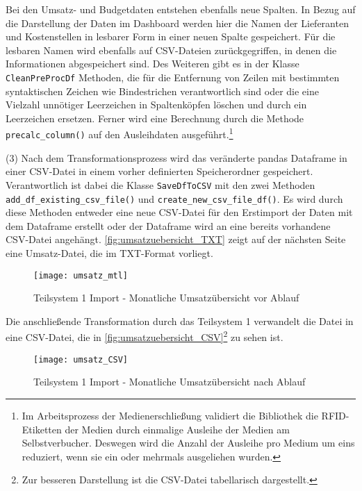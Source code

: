     
    Bei den Umsatz- und Budgetdaten entstehen ebenfalls neue Spalten. In Bezug auf die Darstellung der Daten im Dashboard werden
    hier die Namen der Lieferanten und Kostenstellen in lesbarer Form in einer neuen Spalte gespeichert. Für die lesbaren Namen wird ebenfalls auf CSV-Dateien zurückgegriffen, in denen die Informationen abgespeichert sind.
    Des Weiteren gibt es in der Klasse \texttt{CleanPreProcDf} Methoden, die für die Entfernung von Zeilen mit bestimmten syntaktischen Zeichen wie Bindestrichen 
    verantwortlich sind oder die eine Vielzahl unnötiger Leerzeichen in Spaltenköpfen löschen  und durch ein Leerzeichen ersetzen.
    Ferner wird eine Berechnung durch die Methode \texttt{precalc\_column()} auf den Ausleihdaten ausgeführt.\footnote{ Im Arbeitsprozess der Medienerschließung validiert die Bibliothek die RFID-Etiketten der Medien durch einmalige Ausleihe der Medien am Selbstverbucher.
    Deswegen wird die Anzahl der Ausleihe pro Medium um eins reduziert, wenn sie ein oder mehrmals ausgeliehen wurden.}
     
    (3) Nach dem Transformationsprozess wird das veränderte pandas Dataframe in einer CSV-Datei in einem vorher definierten Speicherordner gespeichert. 
    Verantwortlich ist dabei die Klasse \texttt{SaveDfToCSV} mit den zwei Methoden \texttt{add\_df\_existing\_csv\_file()} und 
    \texttt{create\_new\_csv\_file\_df()}. 
    Es wird durch diese Methoden entweder eine neue CSV-Datei für den Erstimport der Daten mit dem Dataframe erstellt oder der Dataframe wird an eine bereits vorhandene CSV-Datei angehängt.
    \autoref{fig:umsatzuebersicht_TXT} zeigt auf der nächsten Seite eine Umsatz-Datei, die im TXT-Format vorliegt.

    \begin{figure}[H]
        \centering
            \texttt{[image: umsatz\_mtl]}
            \caption{Teilsystem 1 Import - Monatliche Umsatzübersicht vor Ablauf}
            \label{fig:umsatzuebersicht_TXT}
    \end{figure}

    Die anschließende Transformation durch das Teilsystem 1
    verwandelt die Datei in eine CSV-Datei, die in \autoref{fig:umsatzuebersicht_CSV}\footnote{ Zur besseren Darstellung ist die CSV-Datei tabellarisch dargestellt.} zu sehen ist.
 

    \begin{figure}[H]
        \centering
            \texttt{[image: umsatz\_CSV]}
            \caption{Teilsystem 1 Import - Monatliche Umsatzübersicht nach Ablauf}
            \label{fig:umsatzuebersicht_CSV}
    \end{figure}

